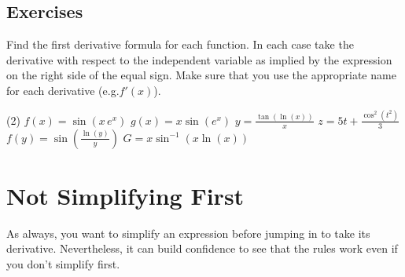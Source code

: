 \documentclass[12pt,]{book}
\theoremstyle{plain}
\theoremstyle{definition}
\numberwithin{equation}{section}
\newcommand{\fe}[2]{#1\mathopen{}\left(#2\right)\mathclose{}}
\newcommand{\fd}[1]{#1'}
\begin{document}
\subsection[Exercises]{Exercises}\label{exercises-44}
Find the first derivative formula for each function.  In each case take the derivative with respect to the independent variable as implied by the expression on the right side of the equal sign.  Make sure that you use the appropriate name for each derivative (e.g.\@ \(\fe{\fd{f}}{x}\)).%
\par
\begin{exercisegroup}(2)
\exercise[1.]\hypertarget{exercise-455}{\null}\(\fe{f}{x}=\fe{\sin}{x\,e^x}\)%
\exercise[2.]\hypertarget{exercise-456}{\null}\(\fe{g}{x}=x\fe{\sin}{e^x}\)%
\exercise[3.]\hypertarget{exercise-457}{\null}\(y=\frac{\fe{\tan}{\fe{\ln}{x}}}{x}\)%
\exercise[4.]\hypertarget{exercise-458}{\null}\(z=5t+\frac{\fe{\cos^2}{t^2}}{3}\)%
\exercise[5.]\hypertarget{exercise-459}{\null}\(\fe{f}{y}=\fe{\sin}{\frac{\fe{\ln}{y}}{y}}\)%
\exercise[6.]\hypertarget{exercise-460}{\null}\(G=x\fe{\sin^{-1}}{x\fe{\ln}{x}}\)%
\end{exercisegroup}
\par\smallskip\noindent
\typeout{************************************************}
\typeout{************************************************}
\section[Not Simplifying First]{Not Simplifying First}\label{section-not-simplifying-first}
As always, you want to simplify an expression before jumping in to take its derivative.  Nevertheless, it can build confidence to see that the rules work even if you don't simplify first.%
\typeout{************************************************}
\typeout{************************************************}
\end{document}

